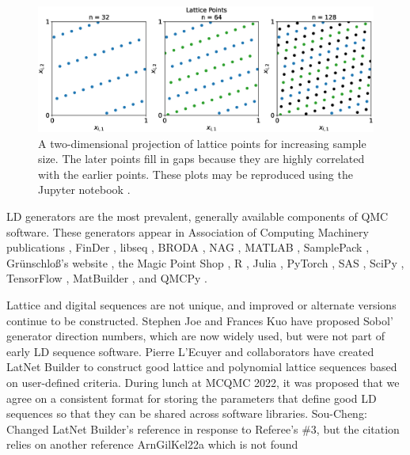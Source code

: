 \documentclass[graybox]{svmult}
\newcommand{\SCComment}[1]{{\color{green} Sou-Cheng: #1}}
\begin{document}
\begin{figure}[t]
    \centering
    \includegraphics[width=\textwidth]{latticepts.eps}
    \caption{A two-dimensional projection of lattice points for increasing sample size.  The later points fill in gaps because they are highly correlated with the earlier points.  These plots may be reproduced using the Jupyter notebook \cite{MCQMC2022Figs}. }
    \label{CDHJSfiglatticepts}
\end{figure}

LD generators are the most prevalent, generally available components of QMC software.  These generators appear in Association of Computing Machinery  publications \cite{BraFox88,BraFoxNie92,HonHic00a}, FinDer \cite{PasTra95,FinDer}, libseq \cite{FriKel02,FriKelweb}, BRODA \cite{BRODA20a}, NAG \cite{NAG27}, MATLAB \cite{MAT9.13}, SamplePack \cite{SamplePack}, Gr\"unschlo{\ss}'s website \cite{GruWeb}, the Magic Point Shop \cite{NuyWeb}, R \cite{QRNG2020}, Julia \cite{QMCJulia}, PyTorch \cite{paszke2019pytorch}, SAS \cite{SAS_LD}, SciPy \cite{virtanen2020scipy},  TensorFlow \cite{tfqfQMC2021a}, MatBuilder \cite{paulin2022}, and  QMCPy \cite{QMCPy2020a}.

Lattice and digital sequences are not unique, and improved or alternate versions continue to be constructed.  Stephen Joe and Frances Kuo \cite{JoeKuo03,KuoJoe08a,SobolDirection} have proposed  Sobol' generator direction numbers, which are now widely used, but were not part of early LD sequence software.  Pierre L'Ecuyer and collaborators have created LatNet Builder \cite{LEcEtal22a} to construct good lattice and polynomial lattice sequences based on user-defined criteria. During lunch at MCQMC 2022, it was proposed that we  agree on a consistent format for storing the parameters that define good LD sequences so that they can be shared across software libraries. \SCComment{Changed LatNet Builder's reference in response to Referee's \#3, but the citation relies on another reference ArnGilKel22a which is not found}
\end{document}
